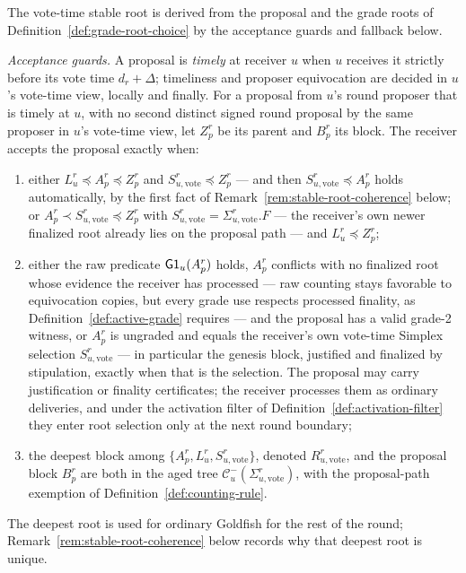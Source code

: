 \begin{definition}\label{def:stable-root}
The vote-time stable root is derived from the proposal and the grade
roots of Definition~\ref{def:grade-root-choice} by the acceptance
guards and fallback below.

\emph{Acceptance guards.}
A proposal is \emph{timely} at receiver \(u\) when \(u\) receives it
strictly before its vote time \(d_r+\Delta\); timeliness and proposer
equivocation are decided in \(u\)'s vote-time view, locally and finally.
For a proposal from \(u\)'s round proposer that is timely at \(u\), with no
second distinct signed round proposal by the same proposer in \(u\)'s
vote-time view, let \(Z_p^r\)
be its parent and \(B_p^r\) its block.  The receiver accepts the proposal
exactly when:
\begin{enumerate}
 \item either \(L_u^r\preceq A_p^r\preceq Z_p^r\) and
 \(S_{u,\mathrm{vote}}^r\preceq Z_p^r\) --- and then
 \(S_{u,\mathrm{vote}}^r\preceq A_p^r\) holds automatically, by the
 first fact of Remark~\ref{rem:stable-root-coherence} below; or
 \(A_p^r\prec S_{u,\mathrm{vote}}^r\preceq Z_p^r\) with
 \(S_{u,\mathrm{vote}}^r=\Sigma_{u,\mathrm{vote}}^r.F\) --- the
 receiver's own newer finalized root already lies on the proposal path
 --- and \(L_u^r\preceq Z_p^r\);
 \item either the raw predicate \(\mathsf{G1}_u(A_p^r)\) holds, \(A_p^r\)
 conflicts with no finalized root whose evidence the receiver has
 processed --- raw counting stays favorable to equivocation copies, but
 every grade use respects processed finality, as
 Definition~\ref{def:active-grade} requires --- and the proposal
 has a valid grade-2 witness, or \(A_p^r\) is ungraded and equals the
 receiver's own vote-time Simplex selection \(S_{u,\mathrm{vote}}^r\) ---
 in particular the genesis block, justified and finalized by stipulation,
 exactly when that is the selection.  The proposal may carry
 justification or finality certificates; the receiver processes them as
 ordinary deliveries, and under the activation filter of
 Definition~\ref{def:activation-filter} they enter root selection only at
 the next round boundary;
 \item the deepest block among
 \(\{A_p^r,L_u^r,S_{u,\mathrm{vote}}^r\}\), denoted
 \(R_{u,\mathrm{vote}}^r\), and the proposal block \(B_p^r\) are both in
 the aged tree \(\mathcal C^{-}_u(\Sigma_{u,\mathrm{vote}}^r)\), with
 the proposal-path exemption of Definition~\ref{def:counting-rule}.
\end{enumerate}
The deepest root is used for ordinary Goldfish for the rest of the
round; Remark~\ref{rem:stable-root-coherence} below records why that
deepest root is unique.


\end{definition}
